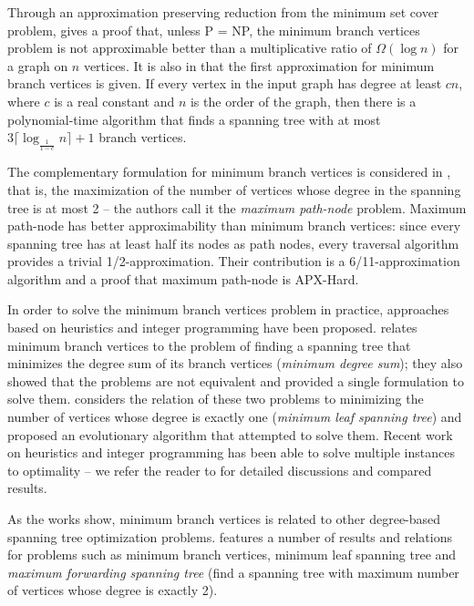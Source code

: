 \documentclass[12pt]{article}
\begin{document}
Through an approximation preserving reduction from the minimum set cover problem, \cite{salamon2010} gives a proof that, unless P = NP, the minimum branch vertices problem is not approximable better than a multiplicative ratio of $\Omega(\log n)$ for a graph on $n$ vertices.
It is also in \cite{salamon2010} that the first approximation for minimum branch vertices is given.
If every vertex in the input graph has degree at least $cn$, where $c$ is a real constant and $n$ is the order of the graph, then there is a polynomial-time algorithm that finds a spanning tree with at most $3\lceil \log_{\frac{1}{1 - c}}n\rceil + 1$ branch vertices. 

The complementary formulation for minimum branch vertices is considered in \cite{chimani2015}, that is, the maximization of the number of vertices whose degree in the spanning tree is at most 2 -- the authors call it the \emph{maximum path-node} problem.
Maximum path-node has better approximability than minimum branch vertices: since every spanning tree has at least half its nodes as path nodes, every traversal algorithm provides a trivial 1/2-approximation.
Their contribution is a 6/11-approximation algorithm and a proof that maximum path-node is APX-Hard.

In order to solve the minimum branch vertices problem in practice, approaches based on heuristics and integer programming have been proposed.
\cite{cerulli2009} relates minimum branch vertices to the problem of finding a spanning tree that minimizes the degree sum of its branch vertices (\emph{minimum degree sum}); they also showed that the problems are not equivalent and provided a single formulation to solve them.
\cite{cerrone2014} considers the relation of these two problems to minimizing the number of vertices whose degree is exactly one (\emph{minimum leaf spanning tree}) and proposed an evolutionary algorithm that attempted to solve them.
Recent work on heuristics and integer programming has been able to solve multiple instances to optimality -- we refer the reader to \cite{marin2015, melo2016, silvestri2017} for detailed discussions and compared results.

As the works \cite{cerulli2009, cerrone2014} show, minimum branch vertices is related to other degree-based spanning tree optimization problems.
\cite{salamon2010} features a number of results and relations for problems such as minimum branch vertices, minimum leaf spanning tree and \emph{maximum forwarding spanning tree} (find a spanning tree with maximum number of vertices whose degree is exactly 2).
\end{document}
